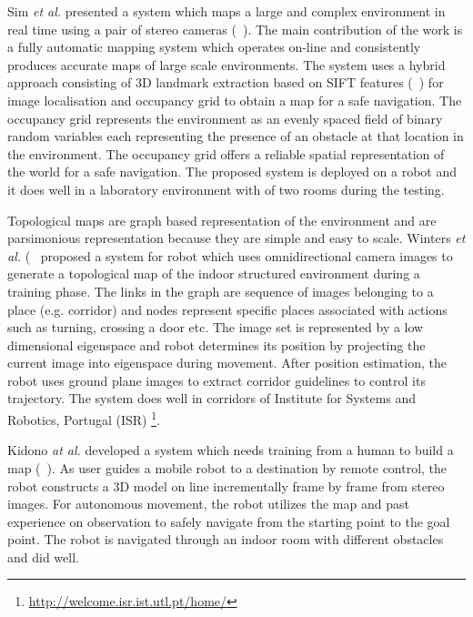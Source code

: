Sim \emph{et al.} presented a system which maps 
a large and complex environment in real time using 
a pair of stereo cameras (~\citet{sim06}). 
The main contribution of the work 
is a fully automatic mapping system which operates 
on-line and consistently produces accurate maps of 
large scale environments. The system uses a hybrid approach 
consisting of 3D landmark extraction based on 
SIFT features (~\citet{lowe04}) for 
image localisation and occupancy grid 
to obtain a map for a safe navigation. 
The occupancy grid represents
the environment as an evenly spaced 
field of binary random variables each 
representing the presence of an obstacle 
at that location in the environment.
The occupancy grid offers a reliable 
spatial representation of the 
world for a safe navigation. 
The proposed system is deployed on 
a robot and it does well in a laboratory 
environment with of two rooms during the testing. 


Topological maps are graph based representation 
of the environment and are 
parsimonious representation because they are 
simple and easy to scale. Winters \emph{et al.} (~\citet{winters99} 
proposed a system for robot which 
uses omnidirectional camera images to generate a 
topological map of the indoor structured 
environment during a training phase.
The links in the graph are sequence of images 
belonging to a place (e.g. corridor) and nodes 
represent specific places associated with actions 
such as turning, crossing a door etc. 
The image set is represented by %
a low dimensional eigenspace and robot determines
its position by projecting the current image into eigenspace 
during movement. After position estimation, 
the robot uses ground plane images to extract 
corridor guidelines to control its trajectory. 
The system does well in corridors of 
Institute for Systems and Robotics, Portugal (ISR) 
\footnote{\url{http://welcome.isr.ist.utl.pt/home/}}.


Kidono \emph{at al.} developed a system 
which needs training from a human to build a map (~\citet{kidono02}). 
As user guides a mobile robot to a
destination by remote control, 
the robot constructs a 3D model on line incrementally 
frame by frame from stereo images. 
For autonomous movement, the robot 
utilizes the map and past experience on observation 
to safely navigate from the starting point 
to the goal point.  The robot is navigated through an 
indoor room with different obstacles and did well.




